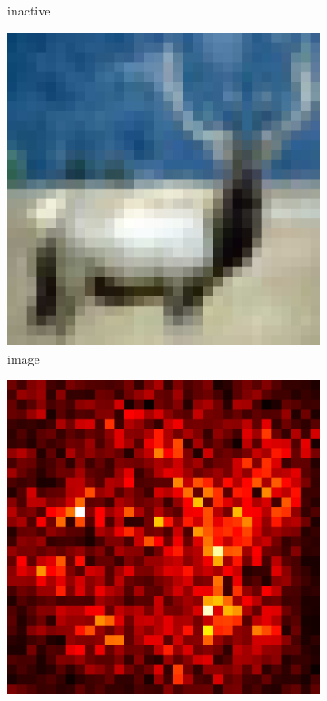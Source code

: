 \documentclass[preprint,12pt]{elsarticle}
\begin{document}
\begin{figure}
\begin{subfigure}{0.14\textwidth}
        \caption{inactive}
    \end{subfigure}
    \hfill
    \begin{subfigure}{0.14\linewidth}
    \centering
    \includegraphics[width=\linewidth]{../visualizations/examples/cifar10/resnet18/images/4.png}
    \caption{image}
    \end{subfigure}
    \hfill
    \begin{subfigure}{0.14\linewidth}
        \centering
        \includegraphics[width=\linewidth]{../visualizations/examples/cifar10/resnet18/saliency_map/4.png}

\end{subfigure}
\end{figure}
\end{document}
